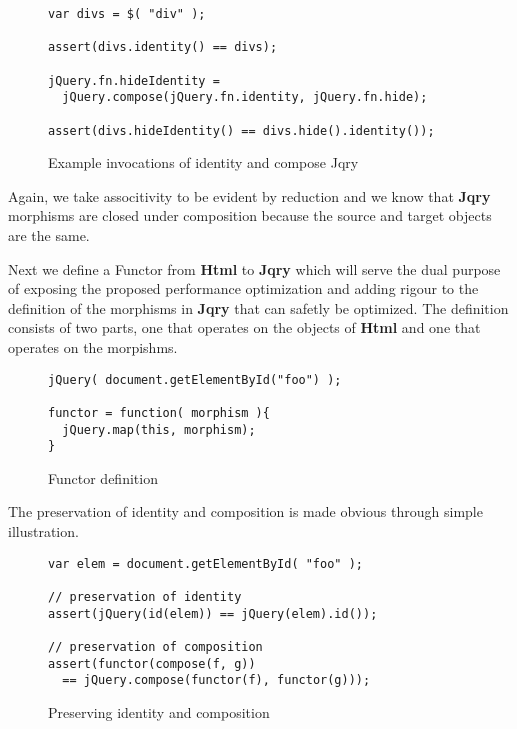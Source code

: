 \documentclass[preprint,10pt]{sigplanconf}
\begin{document}
\begin{figure}[h!]
\small
\begin{verbatim}
var divs = $( "div" );

assert(divs.identity() == divs);

jQuery.fn.hideIdentity =
  jQuery.compose(jQuery.fn.identity, jQuery.fn.hide);

assert(divs.hideIdentity() == divs.hide().identity());
\end{verbatim}
\nocaptionrule \caption{Example invocations of identity and compose Jqry}
\label{fig:sample-jqry-compose}
\end{figure}

Again, we take associtivity to be evident by reduction and we know that \textbf{Jqry} morphisms are closed under composition because the source and target objects are the same.

Next we define a Functor from \textbf{Html} to \textbf{Jqry} which will serve the dual purpose of exposing the proposed performance optimization and adding rigour to the definition of the morphisms in \textbf{Jqry} that can safetly be optimized. The definition consists of two parts, one that operates on the objects of \textbf{Html} and one that operates on the morpishms.

\begin{figure}[h!]
\small
\begin{verbatim}
jQuery( document.getElementById("foo") );

functor = function( morphism ){
  jQuery.map(this, morphism);
}
\end{verbatim}
\nocaptionrule \caption{Functor definition}
\end{figure}

The preservation of identity and composition is made obvious through simple illustration.

\begin{figure}[h!]
\small
\begin{verbatim}
var elem = document.getElementById( "foo" );

// preservation of identity
assert(jQuery(id(elem)) == jQuery(elem).id());

// preservation of composition
assert(functor(compose(f, g))
  == jQuery.compose(functor(f), functor(g)));
\end{verbatim}
\nocaptionrule \caption{Preserving identity and composition}
\end{figure}
\end{document}
